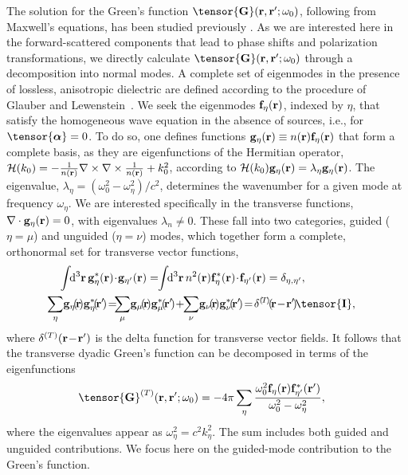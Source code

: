 \documentclass[aps,pra,twocolumn]{revtex4-1} %
\newcommand{\unittens}{\tensor{\mathbf{I}}}
\newcommand{\eigenf}{\mbf{f}_\eta}
\newcommand{\eigenfp}{\mbf{f}_{\eta'}}
\newcommand{\eigeng}{\mbf{g}_\eta}
\newcommand{\eigengp}{\mbf{g}_{\eta'}}
\begin{document}
The solution for the Green's function $\tensor{\mathbf{G}}(\br ,\br' ; \omega_0)$, following from Maxwell's equations,  
has been studied previously \cite{sakoda_optical_1996,sondergaard_general_2001,wubs_multiple-scattering_2004}.  As we are interested here in the forward-scattered components that lead to phase shifts and polarization transformations, we directly calculate $\tensor{\mathbf{G}}(\br ,\br' ; \omega_0)$ through a decomposition into normal modes.  A complete set of eigenmodes in the presence of lossless, anisotropic dielectric are defined according to the procedure of Glauber and Lewenstein~\cite{glauber_quantum_1991}.  We seek the eigenmodes $\eigenf(\mathbf{r})$, indexed by $\eta$, that satisfy the homogeneous wave equation in the absence of sources, i.e.,  for $\tensor{\boldsymbol{\alpha}} = 0$.  To do so, one defines functions $\eigeng(\mbf{r}) \equiv n(\br) \eigenf(\mbf{r})$ that form a complete basis, as they are eigenfunctions of the Hermitian operator, $\mathcal{H}(k_0) = -\frac{1}{n(\mathbf{r})} \nabla\times\nabla\times \frac{1}{n(\mathbf{r})} + k_0^2$, according to $\mathcal{H}(k_0)  \eigeng(\mbf{r}) = \lambda_\eta \eigeng(\mbf{r})$. The eigenvalue, {\color{blue} $\lambda_\eta= (\omega_0^2-\omega_\eta^2)/c^2$}, determines the wavenumber for a given mode {\color{blue} at frequency $\omega_\eta$}.  We are interested specifically in the transverse functions, $\nabla\cdot \eigeng(\br) = 0$, with eigenvalues $\lambda_n \neq 0$.  These fall into two categories, guided {\color{blue} ($\eta = \mu$)} and unguided {\color{blue} ($\eta = \nu$)} modes, which {\color{blue} together} form a complete, orthonormal set for transverse vector functions,
	\begin{align}
	&\int\!\! \mathrm{d}^3\br \, \eigeng^*(\mbf{r}) \!\cdot\! \eigengp(\mbf{r})  =\!\! \int\!\! \mathrm{d}^3\br \, n^2(\br) \eigenf^* (\br)\!\cdot\!  \eigenfp(\br) =\delta_{\eta, \eta'},\label{Eq::Orthogonality}\\
	&\!\!\!\!\!\!\!\sum_\eta \!\mathbf{g}_\eta\!(\!\br\!) \mathbf{g}_\eta^*\!(\!\br'\!) \!=\!\!\!  \sum_\mu\! \mathbf{g}_\mu\!(\!\br\!) \mathbf{g}_\mu^*\!(\!\br'\!)  \!+\!\! \sum_\nu\! \mathbf{g}_\nu\!(\!\br\!) \mathbf{g}_\nu^*\!(\!\br'\!)  \!=\!\delta^{(\!T\!)}\!(\!\br\!-\!\br'\!)\!  \unittens, \label{Eq::Completeness}
	\end{align}
where $\delta^{(T)}(\mathbf{r}\!-\!\mathbf{r}')$ is the delta function for transverse vector fields.  It follows that the transverse dyadic Green's function can be decomposed in terms of the eigenfunctions~\cite{sakoda_optical_1996, sondergaard_general_2001}
	\begin{align}
		\tensor{\mathbf{G}}^{(T)}(\br,\br'; \omega_0) &= -4\pi \sum_{\eta} \frac{  \omega_0^2 \eigenf (\br) 
\eigenfp^* (\br')}{\omega_0^2-\omega_\eta^2},
	\end{align}
where the eigenvalues appear as $\omega_\eta^2 = c^2 k_\eta^2$.  The sum includes both guided and unguided contributions. We focus here on the guided-mode contribution to the Green's function. 
\end{document}
